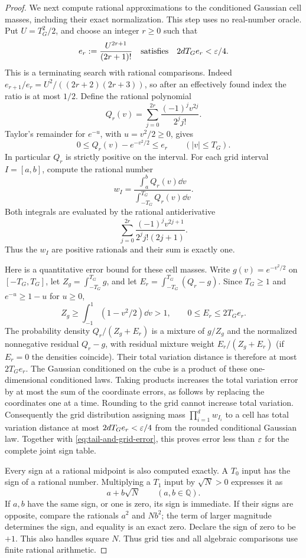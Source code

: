 \begin{proof}
We next compute rational approximations to the conditioned Gaussian cell
masses, including their exact normalization. This step uses no real-number
oracle. Put $U=T_G^2/2$, and choose an integer $r\ge0$ such that
\[
 e_r:=\frac{U^{2r+1}}{(2r+1)!}
 \quad\text{satisfies}\quad 2dT_G e_r<\varepsilon/4.
\]
This is a terminating search with rational comparisons. Indeed
$e_{r+1}/e_r=U^2/((2r+2)(2r+3))$, so after an effectively found index
the ratio is at most $1/2$. Define the rational polynomial
\[
 Q_r(v)=\sum_{j=0}^{2r}\frac{(-1)^jv^{2j}}{2^j j!}.
\]
Taylor's remainder for $e^{-u}$, with $u=v^2/2\ge0$, gives
\begin{equation}\label{eq:positive-density-polynomial}
 0\le Q_r(v)-e^{-v^2/2}\le e_r
 \qquad (|v|\le T_G).
\end{equation}
In particular $Q_r$ is strictly positive on the interval. For each grid
interval $I=[a,b]$, compute the rational number
\begin{equation}\label{eq:rational-cell-mass}
 w_I=\frac{\displaystyle\int_a^b Q_r(v)\dd v}
            {\displaystyle\int_{-T_G}^{T_G} Q_r(v)\dd v}.
\end{equation}
Both integrals are evaluated by the rational antiderivative
\[
 \sum_{j=0}^{2r}\frac{(-1)^jv^{2j+1}}{2^j j!(2j+1)}.
\]
Thus the $w_I$ are positive rationals and their sum is exactly one.

Here is a quantitative error bound for these cell masses. Write
$g(v)=e^{-v^2/2}$ on $[-T_G,T_G]$, let $Z_g=\int_{-T_G}^{T_G}g$, and let
$E_r=\int_{-T_G}^{T_G}(Q_r-g)$. Since $T_G\ge1$ and $e^{-u}\ge1-u$ for
$u\ge0$,
\[
 Z_g\ge\int_{-1}^1(1-v^2/2)\dd v>1,
 \qquad 0\le E_r\le2T_G e_r.
\]
The probability density $Q_r/(Z_g+E_r)$ is a mixture of $g/Z_g$ and
the normalized nonnegative residual $Q_r-g$, with residual mixture
weight $E_r/(Z_g+E_r)$ (if $E_r=0$ the densities coincide).
Their total variation distance is therefore at most $2T_G e_r$.
The Gaussian conditioned on the cube is a product of these
one-dimensional conditioned laws. Taking products increases the total
variation error by at most the sum of the coordinate errors, as follows
by replacing the coordinates one at a time. Rounding to the grid cannot
increase total variation. Consequently the grid distribution assigning
mass $\prod_{i=1}^d w_{I_i}$ to a cell has total variation distance at
most $2dT_G e_r<\varepsilon/4$ from the rounded conditional Gaussian law.
Together with \eqref{eq:tail-and-grid-error}, this proves error less than
$\varepsilon$ for the complete joint sign table.

Every sign at a rational midpoint is also computed exactly. A $T_0$
input has the sign of a rational number. Multiplying a $T_1$ input by
$\sqrt N>0$ expresses it as
\[
 a+b\sqrt N\qquad(a,b\in\mathbb Q).
\]
If $a,b$ have the same sign, or one is zero, its sign is immediate.
If their signs are opposite, compare the rationals $a^2$ and $Nb^2$;
the term of larger magnitude determines the sign, and equality is
an exact zero. Declare the sign of zero to be $+1$. This also handles
square $N$. Thus grid ties and all algebraic comparisons use finite
rational arithmetic.


\end{proof}
